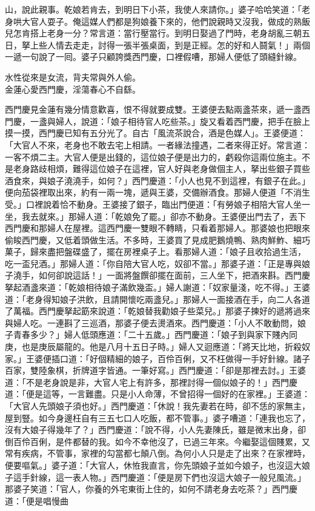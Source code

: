 山，說此親事。乾娘若肯去，到明日下小茶，我使人來請你。」婆子哈哈笑道：「老身哄大官人耍子。俺這媒人們都是狗娘養下來的，他們說親時又沒我，做成的熟飯兒怎肯搭上老身一分？常言道：當行壓當行。到明日娶過了門時，老身胡亂三朝五日，拏上些人情去走走，討得一張半張桌面，到是正經。怎的好和人鬪氣！」兩個一遞一句說了一囘。婆子只顧誇獎西門慶，口裡假嘈，那婦人便低了頭縫針線。

\begin{myquote} 
水性從來是女流，背夫常與外人偷。\\金蓮心愛西門慶，淫蕩春心不自繇。
\end{myquote} 

西門慶見金蓮有幾分情意歡喜，恨不得就要成雙。王婆便去點兩盞茶來，遞一盞西門慶，一盞與婦人，說道：「娘子相待官人吃些茶。」旋又看着西門慶，把手在臉上摸一摸，西門慶已知有五分光了。自古「風流茶說合，酒是色媒人」。王婆便道：「大官人不來，老身也不敢去宅上相請。一者緣法撞遇，二者來得正好。常言道：一客不煩二主。大官人便是出錢的，這位娘子便是出力的，虧殺你這兩位施主。不是老身路歧相煩，難得這位娘子在這裡，官人好與老身做個主人，拏出些銀子買些酒食來，與娘子澆澆手，如何？」西門慶道：「小人也見不到這裡，有銀子在此。」便向茄袋裡取出來，約有一兩一塊，遞與王婆，交備辦酒食。那婦人便道「不消生受。」口裡說着恰不動身。王婆接了銀子，臨出門便道：「有勞娘子相陪大官人坐一坐，我去就來。」那婦人道：「乾娘免了罷。」卻亦不動身。{}王婆便出門去了，丟下西門慶和那婦人在屋裡。這西門慶一雙眼不轉睛，只看着那婦人。那婆娘也把眼來偷睃西門慶，又低着頭做生活。不多時，王婆買了見成肥鵝燒鴨、熟肉鮮鮓、細巧菓子，歸來盡把盤碟盛了，擺在房裡桌子上。看那婦人道：「娘子且收拾過生活，吃一盃兒酒。」那婦人道：「你自陪大官人吃，奴卻不當。」那婆子道：「正是專與娘子澆手，如何卻說這話！」一面將盤饌卻擺在面前，三人坐下，把酒來斟。西門慶拏起酒盞來道：「乾娘相待娘子滿飲幾盃。」婦人謝道：「奴家量淺，吃不得。」王婆道：「老身得知娘子洪飲，且請開懷吃兩盞兒。」那婦人一面接酒在手，向二人各道了萬福。西門慶拏起筯來說道：「乾娘替我勸娘子些菜兒。」那婆子揀好的遞將過來與婦人吃。一連斟了三巡酒，那婆子便去燙酒來。西門慶道：「小人不敢動問，娘子青春多少？」婦人低頭應道：「二十五歲。」西門慶道：「娘子到與家下賤內同庚，也是庚辰屬龍的。他是八月十五日子時。」婦人又迴應道：「將天比地，折殺奴家。」王婆便插口道：「好個精細的娘子，百伶百俐，又不枉做得一手好針線。諸子百家，雙陸象棋，折牌道字皆通。一筆好寫。」西門慶道：「卻是那裡去討。」王婆道：「不是老身說是非，大官人宅上有許多，那裡討得一個似娘子的！」西門慶道：「便是這等，一言難盡。只是小人命薄，不曾招得一個好的在家裡。」王婆道：「大官人先頭娘子須也好。」西門慶道：「休說！我先妻若在時，卻不恁的家無主，屋到豎。如今身邊枉自有三五七口人吃飯，都不管事。」婆子嘈道：「連我也忘了，沒有大娘子得幾年了？」西門慶道：「說不得，小人先妻陳氏，雖是微末出身，卻倒百伶百俐，{}是件都替的我。如今不幸他沒了，已過三年來。今繼娶這個賤累，又常有疾病，不管事，家裡的勾當都七顛八倒。為何小人只是走了出來？在家裡時，便要嘔氣。」婆子道：「大官人，休恠我直言，你先頭娘子並如今娘子，也沒這大娘子這手針線，這一表人物。」西門慶道：「便是房下們也沒這大娘子一般兒風流。」{}{}那婆子笑道：「官人，你養的外宅東街上住的，如何不請老身去吃茶？」西門慶道：「便是唱慢曲